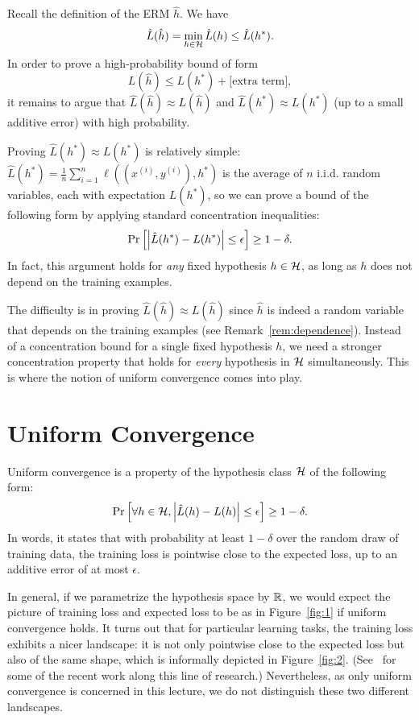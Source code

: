 \documentclass[11pt]{article}
\begin{document}
Recall the definition of the ERM $\hat h$. We have
	\[\hat L(\hat h) = \min_{h \in \mathcal{H}}\hat L(h) \le \hat L(h^*).\]
In order to prove a high-probability bound of form
	\[L(\hat h) \le L(h^*) + \textrm{[extra term]},\]
it remains to argue that $\hat L(\hat h) \approx L(\hat h)$ and $\hat L(h^*) \approx L(h^*)$ (up to a small additive error) with high probability.

Proving $\hat L(h^*) \approx L(h^*)$ is relatively simple: 
	$\hat L(h^*) = \frac{1}{n}\sum_{i=1}^{n}\ell((x^{(i)}, y^{(i)}), h^*)$
is the average of $n$ i.i.d. random variables, each with expectation $L(h^*)$,
so we can prove a bound of the following form by applying standard concentration inequalities:
	\[\Pr_{}\left[\left|\hat L(h^*) - L(h^*)\right| \le \epsilon\right] \ge 1 - \delta.\]
In fact, this argument holds for \emph{any} fixed hypothesis $h \in \mathcal{H}$, as long as $h$ does not depend on the training examples.

The difficulty is in proving $\hat L(\hat h) \approx L(\hat h)$ since $\hat h$ is indeed a random variable that depends on the training examples (see Remark~\ref{rem:dependence}). Instead of a concentration bound for a single fixed hypothesis $h$, we need a stronger concentration property that holds for \emph{every} hypothesis in $\mathcal{H}$ simultaneously. This is where the notion of uniform convergence comes into play.

\section{Uniform Convergence}
Uniform convergence is a property of the hypothesis class $\mathcal{H}$ of the following form:
\begin{equation}
  \label{equation:uc}
  \Pr_{}\left[\forall h \in \mathcal{H}, \left|\hat L(h) - L(h)\right| \le \epsilon\right] \ge 1 - \delta.
\end{equation}
In words, it states that with probability at least $1 - \delta$ over the random draw of training data, the training loss is pointwise close to the expected loss, up to an additive error of at most $\epsilon$.

In general, if we parametrize the hypothesis space by $\mathbb{R}$, we would expect the picture of training loss and expected loss to be as in Figure~\ref{fig:1} if uniform convergence holds. It turns out that for particular learning tasks, the training loss exhibits a nicer landscape: it is not only pointwise close to the expected loss but also of the same shape, which is informally depicted in Figure~\ref{fig:2}. (See~\cite{ge2016matrix,mei2018landscape} for some of the recent work along this line of research.) Nevertheless, as only uniform convergence is concerned in this lecture, we do not distinguish these two different landscapes.
\end{document}
